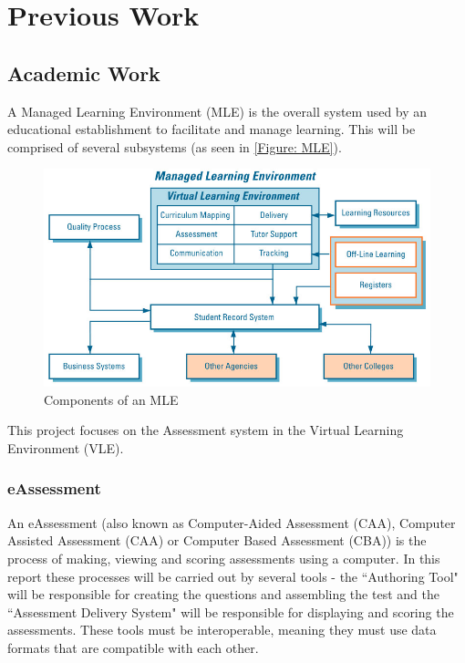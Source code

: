 \chapter{Previous Work} 
\label{Chapter:Previous Work}
\section{Academic Work} 
\label{Section:Academic Work}
A Managed Learning Environment (MLE) is the overall system used by an educational establishment to facilitate and manage learning. This will be comprised of several subsystems (as seen in \autoref{Figure: MLE}).

\begin{figure}[h]
	\centering 
		\includegraphics[scale=0.4]{../figures/MLE.png} 		
	\caption{\label{Figure: MLE} Components of an MLE \citep{mle}} 	
\end{figure}

This project focuses on the Assessment system in the Virtual Learning Environment (VLE).

\subsection{eAssessment}
An eAssessment (also known as Computer-Aided Assessment (CAA), Computer Assisted Assessment (CAA) or Computer Based Assessment (CBA)) is the process of making, viewing and scoring assessments using a computer. In this report these processes will be carried out by several tools - the ``Authoring Tool" will be responsible for creating the questions and assembling the test and the ``Assessment Delivery System" will be responsible for displaying and scoring the assessments. These tools must be interoperable, meaning they must use data formats that are compatible with each other.

